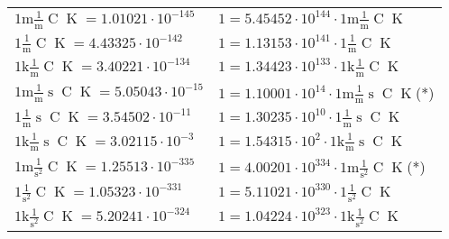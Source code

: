\begin{center}
\begin{longtable}{l l}
{\color{gray}$1 \bm{\mathrm{ m}}\frac1{\operatorname{m}}{}{\operatorname{C}}{\operatorname{K}} = 1.01021\cdot10^{-145} $}   & {\color{gray}$ 1 = 5.45452\cdot10^{144} \cdot 1 \bm{\mathrm{ m}}\frac1{\operatorname{m}}{}{\operatorname{C}}{\operatorname{K}}$}  \\
{\color{black}$1 \bm{\mathrm{ }}\frac1{\operatorname{m}}{}{\operatorname{C}}{\operatorname{K}} = 4.43325\cdot10^{-142} $}   & {\color{black}$ 1 = 1.13153\cdot10^{141} \cdot 1 \bm{\mathrm{ }}\frac1{\operatorname{m}}{}{\operatorname{C}}{\operatorname{K}}$}  \\
{\color{gray}$1 \bm{\mathrm{ k}}\frac1{\operatorname{m}}{}{\operatorname{C}}{\operatorname{K}} = 3.40221\cdot10^{-134} $}   & {\color{gray}$ 1 = 1.34423\cdot10^{133} \cdot 1 \bm{\mathrm{ k}}\frac1{\operatorname{m}}{}{\operatorname{C}}{\operatorname{K}}$}  \\
{\color{gray}$1 \bm{\mathrm{ m}}\frac1{\operatorname{m}}{\operatorname{s}}{\operatorname{C}}{\operatorname{K}} = 5.05043\cdot10^{-15} $}   & {\color{gray}$ 1 = 1.10001\cdot10^{14} \cdot 1 \bm{\mathrm{ m}}\frac1{\operatorname{m}}{\operatorname{s}}{\operatorname{C}}{\operatorname{K}}$}\quad(*)\\
{\color{black}$1 \bm{\mathrm{ }}\frac1{\operatorname{m}}{\operatorname{s}}{\operatorname{C}}{\operatorname{K}} = 3.54502\cdot10^{-11} $}   & {\color{black}$ 1 = 1.30235\cdot10^{10} \cdot 1 \bm{\mathrm{ }}\frac1{\operatorname{m}}{\operatorname{s}}{\operatorname{C}}{\operatorname{K}}$}  \\
{\color{gray}$1 \bm{\mathrm{ k}}\frac1{\operatorname{m}}{\operatorname{s}}{\operatorname{C}}{\operatorname{K}} = 3.02115\cdot10^{-3} $}   & {\color{gray}$ 1 = 1.54315\cdot10^{2} \cdot 1 \bm{\mathrm{ k}}\frac1{\operatorname{m}}{\operatorname{s}}{\operatorname{C}}{\operatorname{K}}$}  \\
{\color{gray}$1 \bm{\mathrm{ m}}{}\frac1{\operatorname{s}^2}{\operatorname{C}}{\operatorname{K}} = 1.25513\cdot10^{-335} $}   & {\color{gray}$ 1 = 4.00201\cdot10^{334} \cdot 1 \bm{\mathrm{ m}}{}\frac1{\operatorname{s}^2}{\operatorname{C}}{\operatorname{K}}$}\quad(*)\\
{\color{black}$1 \bm{\mathrm{ }}{}\frac1{\operatorname{s}^2}{\operatorname{C}}{\operatorname{K}} = 1.05323\cdot10^{-331} $}   & {\color{black}$ 1 = 5.11021\cdot10^{330} \cdot 1 \bm{\mathrm{ }}{}\frac1{\operatorname{s}^2}{\operatorname{C}}{\operatorname{K}}$}  \\
{\color{gray}$1 \bm{\mathrm{ k}}{}\frac1{\operatorname{s}^2}{\operatorname{C}}{\operatorname{K}} = 5.20241\cdot10^{-324} $}   & {\color{gray}$ 1 = 1.04224\cdot10^{323} \cdot 1 \bm{\mathrm{ k}}{}\frac1{\operatorname{s}^2}{\operatorname{C}}{\operatorname{K}}$}  \\

\end{longtable}
\end{center}

